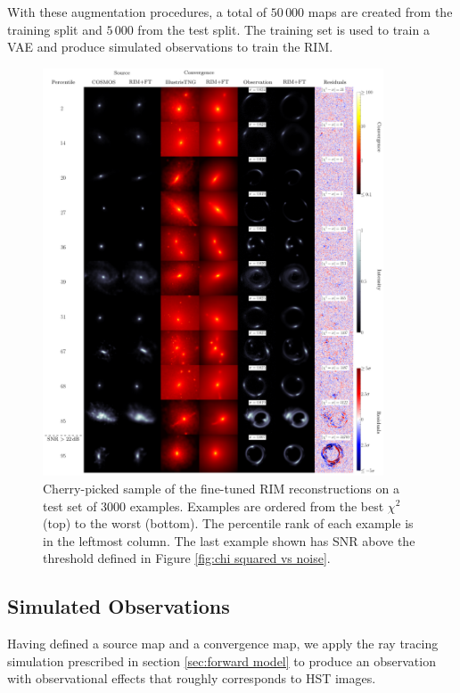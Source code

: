 \documentclass[twocolumn]{aastex631}
\begin{document}
With these augmentation procedures, a total of $50\,000$ maps are created from the training split and 
$5\,000$ from the test split.
The training set is used to train a VAE and produce simulated observations 
to train the RIM. 
\begin{figure}[ht!]
        \centering
        \includegraphics[width=0.9\textwidth]{figures/main_result}
        \caption{
                Cherry-picked sample of the fine-tuned RIM reconstructions 
                on a test set of 3000 examples. 
                Examples are ordered from the best $\chi^2$ (top) to the worst (bottom). 
                The percentile rank of each example is in the leftmost column. 
                The last example 
        shown has SNR above the threshold defined in Figure \ref{fig:chi squared vs noise}.
} 
        \label{fig:main result}

        \newpage
\end{figure}

\subsection{Simulated Observations}\label{sec:simulated observation}
Having defined a source map and a convergence map, we apply the ray tracing simulation 
prescribed in section \ref{sec:forward model} to produce an observation 
with observational effects that roughly corresponds to HST images. 
\end{document}
